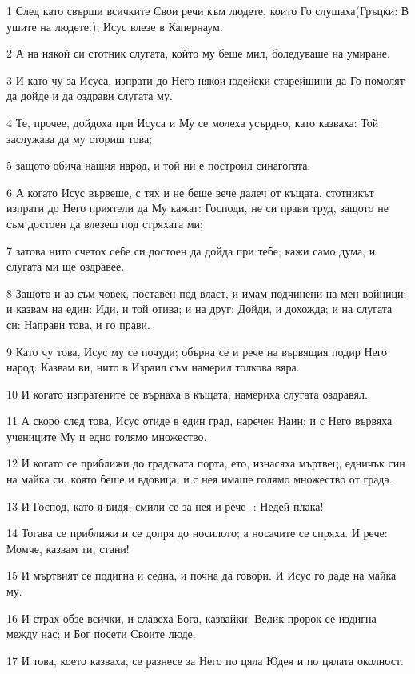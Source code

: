 \par 1 След като свърши всичките Свои речи към людете, които Го слушаха(Гръцки: В ушите на людете.), Исус влезе в Капернаум.
\par 2 А на някой си стотник слугата, който му беше мил, боледуваше на умиране.
\par 3 И като чу за Исуса, изпрати до Него някои юдейски старейшини да Го помолят да дойде и да оздрави слугата му.
\par 4 Те, прочее, дойдоха при Исуса и Му се молеха усърдно, като казваха: Той заслужава да му сториш това;
\par 5 защото обича нашия народ, и той ни е построил синагогата.
\par 6 А когато Исус вървеше, с тях и не беше вече далеч от къщата, стотникът изпрати до Него приятели да Му кажат: Господи, не си прави труд, защото не съм достоен да влезеш под стряхата ми;
\par 7 затова нито счетох себе си достоен да дойда при тебе; кажи само дума, и слугата ми ще оздравее.
\par 8 Защото и аз съм човек, поставен под власт, и имам подчинени на мен войници; и казвам на един: Иди, и той отива; и на друг: Дойди, и дохожда; и на слугата си: Направи това, и го прави.
\par 9 Като чу това, Исус му се почуди; обърна се и рече на вървящия подир Него народ: Казвам ви, нито в Израил съм намерил толкова вяра.
\par 10 И когато изпратените се върнаха в къщата, намериха слугата оздравял.
\par 11 А скоро след това, Исус отиде в един град, наречен Наин; и с Него вървяха учениците Му и едно голямо множество.
\par 12 И когато се приближи до градската порта, ето, изнасяха мъртвец, едничък син на майка си, която беше и вдовица; и с нея имаше голямо множество от града.
\par 13 И Господ, като я видя, смили се за нея и рече -: Недей плака!
\par 14 Тогава се приближи и се допря до носилото; а носачите се спряха. И рече: Момче, казвам ти, стани!
\par 15 И мъртвият се подигна и седна, и почна да говори. И Исус го даде на майка му.
\par 16 И страх обзе всички, и славеха Бога, казвайки: Велик пророк се издигна между нас; и Бог посети Своите люде.
\par 17 И това, което казваха, се разнесе за Него по цяла Юдея и по цялата околност.

